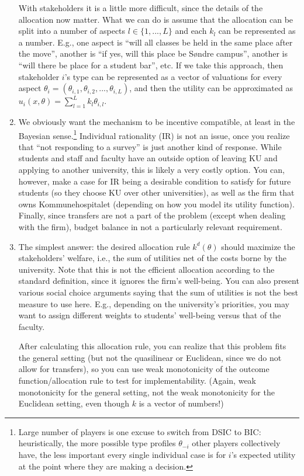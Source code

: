 \documentclass[a4paper]{article}
\begin{document}
\begin{enumerate}
	With stakeholders it is a little more difficult, since the details of the allocation now matter. What we can do is assume that the allocation can be split into a number of aspects $l \in \{1,...,L\}$ and each $k_l$ can be represented as a number. E.g., one aspect is ``will all classes be held in the same place after the move'', another is ``if yes, will this place be S{\o}ndre campus'', another is ``will there be place for a student bar'', etc. If we take this approach, then stakeholder $i$'s type can be represented as a vector of valuations for every aspect $\theta_i = (\theta_{i,1}, \theta_{i,2}, ..., \theta_{i,L})$, and then the utility can be approximated as $u_i(x,\theta) = \sum_{l=1}^L k_l \theta_{i,l}$.
	
	\item We obviously want the mechanism to be incentive compatible, at least in the Bayesian sense.\footnote{Large number of players is one excuse to switch from DSIC to BIC: heuristically, the more possible type profiles $\theta_{-i}$ other players collectively have, the less important every single individual case is for $i$'s expected utility at the point where they are making a decision.}
	Individual rationality (IR) is not an issue, once you realize that ``not responding to a survey'' is just another kind of response. While students and staff and faculty have an outside option of leaving KU and applying to another university, this is likely a very costly option. You can, however, make a case for IR being a desirable condition to satisfy for future students (so they choose KU over other universities), as well as the firm that owns Kommunehospitalet (depending on how you model its utility function).
	Finally, since transfers are not a part of the problem (except when dealing with the firm), budget balance in not a particularly relevant requirement.
	
	\item The simplest answer: the desired allocation rule $k^d(\theta)$ should maximize the stakeholders' welfare, i.e., the sum of utilities net of the costs borne by the university. Note that this is not the efficient allocation according to the standard definition, since it ignores the firm's well-being. You can also present various social choice arguments saying that the sum of utilities is not the best measure to use here. E.g., depending on the university's priorities, you may want to assign different weights to students' well-being versus that of the faculty.
	
	After calculating this allocation rule, you can realize that this problem fits the general setting (but not the quasilinear or Euclidean, since we do not allow for transfers), so you can use weak monotonicity of the outcome function/allocation rule to test for implementability. (Again, weak monotonicity for the general setting, not the weak monotonicity for the Euclidean setting, even though $k$ is a vector of numbers!)
	

\end{enumerate}
\end{document}
